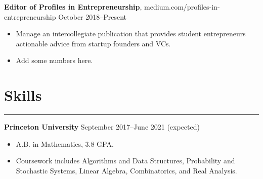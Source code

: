 \documentclass[11pt]{article}
\newcommand{\resumesection}[1]{\vspace{-0.2cm}\section*{#1}\vspace{-0.2cm}\hrule\vspace{0.2cm}}
\begin{document}
\textbf{Editor of Profiles in Entrepreneurship}, medium.com/profiles-in-entrepreneurship \hfill October 2018--Present
\begin{itemize}
	\item Manage an intercollegiate publication that provides student entrepreneurs actionable advice from startup founders and VCs.
	\item Add some numbers here.
\end{itemize}

\resumesection{Skills}

\textbf{Princeton University} \hfill September 2017--June 2021 (expected)
\begin{itemize}
	\item A.B. in Mathematics, 3.8 GPA.
	\item Coursework includes Algorithms and Data Structures, Probability and Stochastic Systems, Linear Algebra, Combinatorics, and Real Analysis.
\end{itemize}
\end{document}
